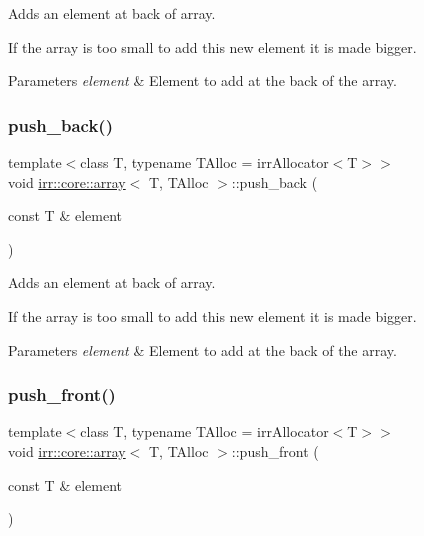 Adds an element at back of array. 

If the array is too small to add this new element it is made bigger. 
\begin{DoxyParams}{Parameters}
{\em element} & Element to add at the back of the array. \\
\hline
\end{DoxyParams}
\mbox{\label{classirr_1_1core_1_1array_ad2c9dff8592b95c25c59f5383fc633fe}} 
\subsubsection{\texorpdfstring{push\+\_\+back()}{push\_back()}\hspace{0.1cm}{\footnotesize\ttfamily [2/2]}}
{\footnotesize\ttfamily template$<$class T, typename T\+Alloc = irr\+Allocator$<$\+T$>$$>$ \\
void \hyperlink{classirr_1_1core_1_1array}{irr\+::core\+::array}$<$ T, T\+Alloc $>$\+::push\+\_\+back (\begin{DoxyParamCaption}\item[{const T \&}]{element }\end{DoxyParamCaption})\hspace{0.3cm}{\ttfamily [inline]}}



Adds an element at back of array. 

If the array is too small to add this new element it is made bigger. 
\begin{DoxyParams}{Parameters}
{\em element} & Element to add at the back of the array. \\
\hline
\end{DoxyParams}
\mbox{\label{classirr_1_1core_1_1array_a31b686ce4b1ebae930f22bc40d30efbd}} 
\subsubsection{\texorpdfstring{push\+\_\+front()}{push\_front()}\hspace{0.1cm}{\footnotesize\ttfamily [1/2]}}
{\footnotesize\ttfamily template$<$class T, typename T\+Alloc = irr\+Allocator$<$\+T$>$$>$ \\
void \hyperlink{classirr_1_1core_1_1array}{irr\+::core\+::array}$<$ T, T\+Alloc $>$\+::push\+\_\+front (\begin{DoxyParamCaption}\item[{const T \&}]{element }\end{DoxyParamCaption})\hspace{0.3cm}{\ttfamily [inline]}}



